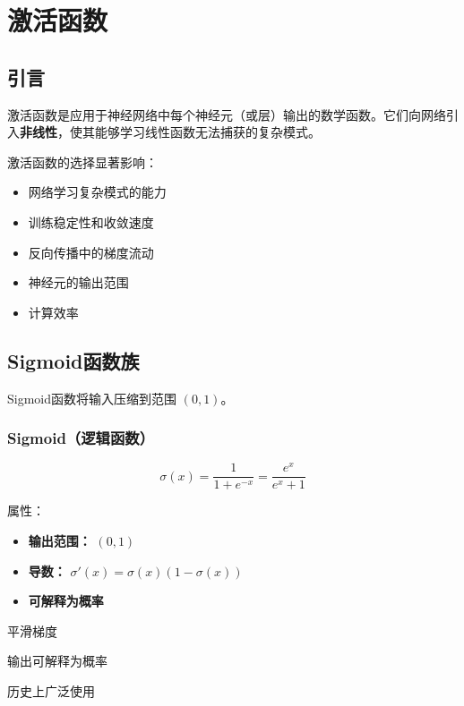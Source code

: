 %

\clearpage
\cleardoublepage

\chapter{激活函数}

\section{引言}

激活函数是应用于神经网络中每个神经元（或层）输出的数学函数。它们向网络引入\textbf{非线性}，使其能够学习线性函数无法捕获的复杂模式。

激活函数的选择显著影响：
\begin{itemize}
    \item 网络学习复杂模式的能力
    \item 训练稳定性和收敛速度
    \item 反向传播中的梯度流动
    \item 神经元的输出范围
    \item 计算效率
\end{itemize}

\section{Sigmoid函数族}

Sigmoid函数将输入压缩到范围 $(0, 1)$。

\subsection{Sigmoid（逻辑函数）}

\begin{equation}
\sigma(x) = \frac{1}{1 + e^{-x}} = \frac{e^x}{e^x + 1}
\end{equation}

属性：
\begin{itemize}
    \item \textbf{输出范围：} $(0, 1)$
    \item \textbf{导数：} $\sigma'(x) = \sigma(x)(1 - \sigma(x))$
    \item \textbf{可解释为概率}
\end{itemize}

\begin{advantages}
    \item 平滑梯度
    \item 输出可解释为概率
    \item 历史上广泛使用
\end{advantages}

